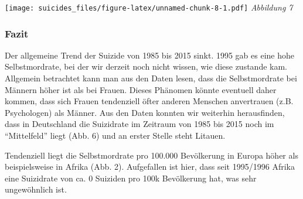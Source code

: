 \documentclass[]{article}
\begin{document}
\texttt{[image: suicides\_files/figure-latex/unnamed-chunk-8-1.pdf]}
\emph{Abbildung 7 }

\hypertarget{fazit}{%
\subsubsection{Fazit}\label{fazit}}

Der allgemeine Trend der Suizide von 1985 bis 2015 sinkt. 1995 gab es
eine hohe Selbstmordrate, bei der wir derzeit noch nicht wissen, wie
diese zustande kam. Allgemein betrachtet kann man aus den Daten lesen,
dass die Selbstmordrate bei Männern höher ist als bei Frauen. Dieses
Phänomen könnte eventuell daher kommen, dass sich Frauen tendenziell
öfter anderen Menschen anvertrauen (z.B. Psychologen) als Männer. Aus
den Daten konnten wir weiterhin herausfinden, dass in Deutschland die
Suizidrate im Zeitraum von 1985 bis 2015 noch im ``Mittelfeld'' liegt
(Abb. 6) und an erster Stelle steht Litauen.

Tendenziell liegt die Selbstmordrate pro 100.000 Bevölkerung in Europa
höher als beispielsweise in Afrika (Abb. 2). Aufgefallen ist hier, dass
seit 1995/1996 Afrika eine Suizidrate von ca. 0 Suiziden pro 100k
Bevölkerung hat, was sehr ungewöhnlich ist.
\end{document}
